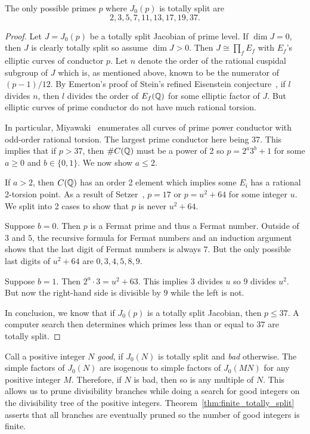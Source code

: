 \begin{lemma}
    \label{lem:good_primes}
    The only possible primes $p$ where $J_0(p)$ is totally split are
    \[
        2, 3, 5, 7, 11, 13, 17, 19, 37.
    \]
\end{lemma}
\begin{proof}
    Let $J=J_0(p)$ be a totally split Jacobian of prime level. If $\dim J=0$,
    then $J$ is clearly totally split so assume $\dim J>0$. Then $J\cong
    \prod_f E_f$ with $E_f$'s elliptic curves of conductor $p$. Let $n$ denote
    the order of the rational cuspidal subgroup of $J$ which is, as mentioned
    above, known to be the numerator of $(p-1)/12$. By Emerton's proof of
    Stein's refined Eisenstein conjecture~\cite[Theorem B]{emerton:optimal}, if
    $l$ divides $n$, then $l$ divides the order of $E_f(\mathbb{Q})$ for some elliptic
    factor of $J$. But elliptic curves of prime conductor do not have much
    rational torsion.

    In particular, Miyawaki~\cite{miyawaki:ell_prime} enumerates all curves of prime
    power conductor with odd-order rational torsion. The largest prime
    conductor here being 37. This implies that if $p>37$, then $\#C(\mathbb{Q})$ must
    be a power of 2 so $p=2^a 3^b + 1$ for some $a\geq 0$ and $b\in \{0,1\}$.
    We now show $a\leq 2$.

    If $a>2$, then $C(\mathbb{Q})$ has an order 2 element which implies some $E_i$ has
    a rational 2-torsion point. As a result of Setzer~\cite[Theorem
    2]{setzer:ell_prime}, $p=17$ or $p=u^2+64$ for some integer $u$. We split into 2
    cases to show that $p$ is never $u^2+64$.

    Suppose $b=0$. Then $p$ is a Fermat prime and thus a Fermat number. Outside
    of $3$ and $5$, the recursive formula for Fermat numbers and an induction
    argument shows that the last digit of Fermat numbers is always $7$. But the
    only possible last digits of $u^2+64$ are $0, 3, 4, 5, 8, 9$.

    Suppose $b=1$. Then $2^a\cdot 3 = u^2+63$. This implies $3$ divides $u$ so
    $9$ divides $u^2$. But now the right-hand side is divisible by $9$ while the
    left is not.

    In conclusion, we know that if $J_0(p)$ is a totally split Jacobian, then $p\leq
    37$. A computer search then determines which primes less than or equal to
    $37$ are totally split.
\end{proof}

Call a positive integer $N$ \emph{good}, if $J_0(N)$ is totally split and
\emph{bad} otherwise. The simple factors of $J_0(N)$ are isogenous to simple
factors of $J_0(MN)$ for any positive integer $M$. Therefore, if $N$ is bad,
then so is any multiple of $N$. This allows us to prune divisibility branches
while doing a search for good integers on the divisibility tree of the positive
integers. Theorem~\ref{thm:finite_totally_split} asserts that all branches are
eventually pruned so the number of good integers is finite.

